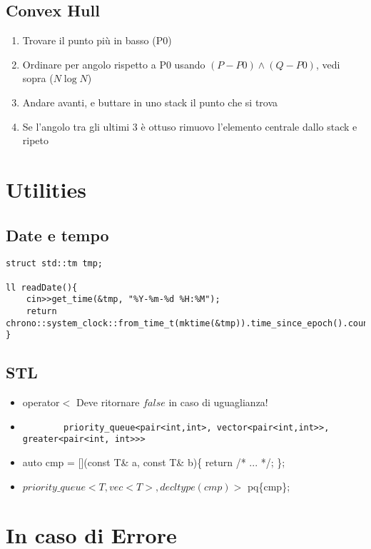 \documentclass{article}
\begin{document}
\subsection{Convex Hull}
\begin{enumerate}
    \item Trovare il punto più in basso (P0)
    \item Ordinare per angolo rispetto a P0 usando $(P-P0)\wedge(Q-P0)$, vedi sopra ($N\log N$)
    \item Andare avanti, e buttare in uno stack il punto che si trova
    \item Se l’angolo tra gli ultimi 3 è ottuso rimuovo l’elemento centrale dallo stack e ripeto
\end{enumerate}

\section{Utilities}

\subsection{Date e tempo}
\begin{lstlisting}
struct std::tm tmp;

ll readDate(){
	cin>>get_time(&tmp, "%Y-%m-%d %H:%M");
	return chrono::system_clock::from_time_t(mktime(&tmp)).time_since_epoch().count();
}
\end{lstlisting}

\subsection{STL}
\begin{itemize}
    \item operator$<$ Deve ritornare $false$ in caso di uguaglianza!
    \item \begin{lstlisting}
        priority_queue<pair<int,int>, vector<pair<int,int>>, greater<pair<int, int>>>
    \end{lstlisting}
    \item auto cmp = [](const T\& a, const T\& b)\{ return /* ... */; \};
    \item $priority\_queue<T,vec<T>,decltype(cmp)>$ pq\{cmp\};
\end{itemize}

\section{In caso di Errore}
\end{document}
